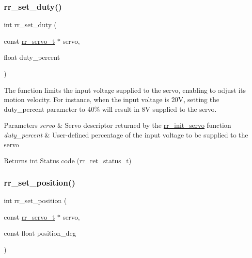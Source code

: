 \subsubsection{\texorpdfstring{rr\+\_\+set\+\_\+duty()}{rr\_set\_duty()}}
{\footnotesize\ttfamily int rr\+\_\+set\+\_\+duty (\begin{DoxyParamCaption}\item[{const \hyperlink{structrr__servo__t}{rr\+\_\+servo\+\_\+t} $\ast$}]{servo,  }\item[{float}]{duty\+\_\+percent }\end{DoxyParamCaption})}



The function limits the input voltage supplied to the servo, enabling to adjust its motion velocity. For instance, when the input voltage is 20V, setting the duty\+\_\+percent parameter to 40\% will result in 8V supplied to the servo. 


\begin{DoxyParams}{Parameters}
{\em servo} & Servo descriptor returned by the \hyperlink{group___init_ga0adb313a3eeb8a4399431e940a1f3e9e}{rr\+\_\+init\+\_\+servo} function \\
\hline
{\em duty\+\_\+percent} & User-\/defined percentage of the input voltage to be supplied to the servo \\
\hline
\end{DoxyParams}
\begin{DoxyReturn}{Returns}
int Status code (\hyperlink{api_8h_a92d5be5038abcf89837faf85a08debdc}{rr\+\_\+ret\+\_\+status\+\_\+t}) 
\end{DoxyReturn}
\mbox{\label{group___motion_gaddb31db79640ec345eb237ddc4d1078f}} 
\subsubsection{\texorpdfstring{rr\+\_\+set\+\_\+position()}{rr\_set\_position()}}
{\footnotesize\ttfamily int rr\+\_\+set\+\_\+position (\begin{DoxyParamCaption}\item[{const \hyperlink{structrr__servo__t}{rr\+\_\+servo\+\_\+t} $\ast$}]{servo,  }\item[{const float}]{position\+\_\+deg }\end{DoxyParamCaption})}



